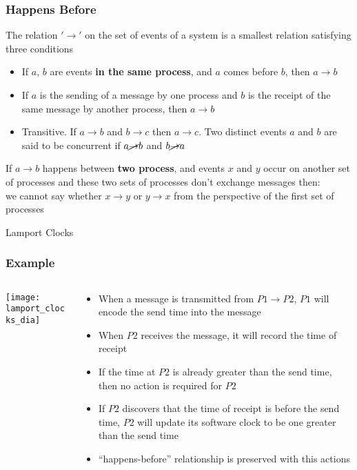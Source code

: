 \documentclass[aspectratio=169, 15pt,usenames,dvipsnames]{beamer}
\begin{document}
	\begin{gdblank}
		\frametitle{Happens Before}
		The relation $'\rightarrow'$ on the set of events of a system is a smallest relation satisfying three conditions
		\begin{itemize}
			\item If $a$, $b$ are events \textbf{in the same process}, and $a$ comes before $b$, then $a\rightarrow b$ 
			\item If $a$ is the sending of a message by one process and $b$ is the receipt of the same message by another process, then $a\rightarrow b$
			\item Transitive. If $a\rightarrow b$ and $b\rightarrow c$ then $a\rightarrow c$. Two distinct events $a$ and $b$ are said to be concurrent if $a\cancel{\rightarrow} b$ and $b\cancel{\rightarrow} a$
		\end{itemize}				
		\par
		If $a\rightarrow b$ happens between \textbf{two process}, and events $x$ and $y$ occur on another set of processes and these two sets of processes don’t exchange messages then:\\
		we cannot say whether $x\rightarrow y$ or $y\rightarrow x$ from the perspective of the first set of processes
	\end{gdblank}
	\begin{gdblank}
		\centering\LARGE
		Lamport Clocks
	\end{gdblank}
	\begin{gdblank}
		\frametitle{Example}
		\begin{columns}
			\begin{column}{0.5\textwidth}
				\texttt{[image: lamport\_clocks\_dia]}			
			\end{column}
			\begin{column}{0.5\textwidth}
				\begin{itemize}
					\item When a message is transmitted from $P1 \rightarrow P2$, $P1$ will encode the send time into the message
					      \pause
					\item When $P2$ receives the message, it will record the time of receipt
					      \pause
					\item If the time at $P2$ is already greater than the send time, then no action is required for $P2$
					      \pause
					\item If $P2$ discovers that the time of receipt is before the send time, $P2$ will update its software clock to be one greater than the send time
					      \pause
					\item “happens-before” relationship is preserved with this actions
				\end{itemize}
			\end{column}	
		\end{columns}
	\end{gdblank}
\end{document}
